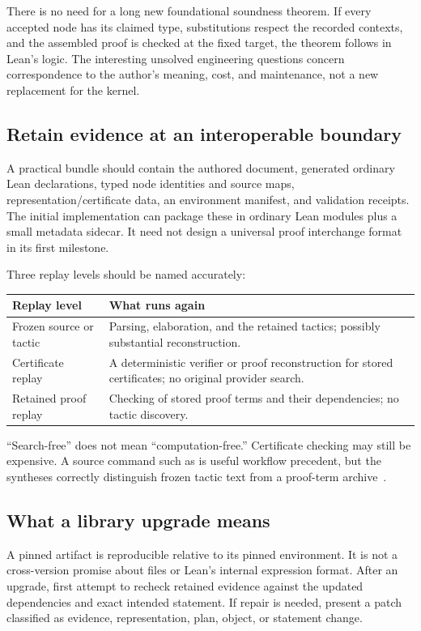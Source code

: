 \documentclass[11pt,a4paper]{article}
\newcommand{\code}[1]{\texttt{\detokenize{#1}}}
\theoremstyle{definition}
\theoremstyle{remark}
\begin{document}
There is no need for a long new foundational soundness theorem. If every accepted node has its claimed type, substitutions respect the recorded contexts, and the assembled proof is checked at the fixed target, the theorem follows in Lean's logic. The interesting unsolved engineering questions concern correspondence to the author's meaning, cost, and maintenance, not a new replacement for the kernel.

\subsection{Retain evidence at an interoperable boundary}
A practical bundle should contain the authored document, generated ordinary Lean declarations, typed node identities and source maps, representation/certificate data, an environment manifest, and validation receipts. The initial implementation can package these in ordinary Lean modules plus a small metadata sidecar. It need not design a universal proof interchange format in its first milestone.

Three replay levels should be named accurately:
\begin{center}\small
\begin{tabularx}{\textwidth}{@{}P{.25\textwidth}Y@{}}
\toprule
Replay level & What runs again\\
\midrule
Frozen source or tactic & Parsing, elaboration, and the retained tactics; possibly substantial reconstruction.\\
Certificate replay & A deterministic verifier or proof reconstruction for stored certificates; no original provider search.\\
Retained proof replay & Checking of stored proof terms and their dependencies; no tactic discovery.\\
\bottomrule
\end{tabularx}
\end{center}
``Search-free'' does not mean ``computation-free.'' Certificate checking may still be expensive. A source command such as \code{says} is useful workflow precedent, but the syntheses correctly distinguish frozen tactic text from a proof-term archive~\cite{synA,synB}.

\subsection{What a library upgrade means}
A pinned artifact is reproducible relative to its pinned environment. It is not a cross-version promise about \code{.olean} files or Lean's internal expression format. After an upgrade, first attempt to recheck retained evidence against the updated dependencies and exact intended statement. If repair is needed, present a patch classified as evidence, representation, plan, object, or statement change.
\end{document}
